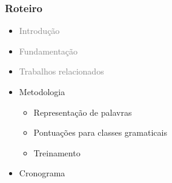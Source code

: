 \documentclass[10pt]{beamer}
\begin{document}
\begin{frame}
  \frametitle{Roteiro}


  \begin{itemize}


    
    \item[\color{gray}{$\bullet$}] \textcolor{gray}{Introdução}
    
    \begin{itemize}
    \end{itemize}


    
    \item[\color{gray}{$\bullet$}] \textcolor{gray}{Fundamentação}

    \begin{itemize}
      \color{gray}{
      \item[\ ] Aprendizado de máquina
      \item[\ ] Córpus
      \item[\ ] Representação de palavras
      \item[\ ] Redes neurais
      \item[\ ] Aprendizagem profunda
      }
    \end{itemize}

    
    \item[\color{gray}{$\bullet$}] \textcolor{gray}{Trabalhos relacionados}

    \item Metodologia

    \begin{itemize}
      \item[\ ] Representação de palavras
      \item[\ ] Pontuações para classes gramaticais
      \item[\ ] Treinamento
    \end{itemize}

    \color{gray}
    \item[\color{gray}{$\bullet$}] Cronograma

  \end{itemize}

\end{frame}
\end{document}
